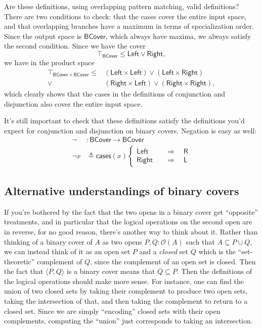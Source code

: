 \documentclass[conference]{IEEEtran}
\newcommand{\Open}[1]{\mathcal{O}({#1})}
\newcommand{\Branch}{\Rightarrow}
\begin{document}
Are these definitions, using overlapping pattern matching, valid definitions? There are two conditions to check: that the cases cover the entire input space, and that overlapping branches have a maximum in terms of specialization order. Since the output space is $\mathsf{BCover}$, which always have maxima, we always satisfy the second condition. Since we have the cover
\[
\top_\mathsf{BCover} \le \mathsf{Left} \vee \mathsf{Right},
\]
we have in the product space
\begin{align*}
\top_{\mathsf{BCover} \times \mathsf{BCover}} \le 
  &(\mathsf{Left} \times \mathsf{Left}) \vee (\mathsf{Left} \times \mathsf{Right})
\\ \vee &(\mathsf{Right} \times \mathsf{Left}) \vee (\mathsf{Right} \times \mathsf{Right}),
\end{align*}
which clearly shows that the cases in the definitions of conjunction and disjunction also cover the entire input space.

It's still important to check that these definitions satisfy the definitions you'd expect for conjunction and disjunction on binary covers. Negation is easy as well:
\begin{align*}
 \neg &: \mathsf{BCover} \to \mathsf{BCover}
\\ \neg x &\triangleq \mathsf{cases}(x)
\begin{cases}
\mathsf{Left}
 \quad &\Branch \quad
 \mathsf{R}
\\
\mathsf{Right}
 \quad &\Branch \quad
 \mathsf{L}
\end{cases}
\end{align*}

\subsection{Alternative understandings of binary covers}

If you're bothered by the fact that the two opens in a binary cover get ``opposite'' treatments, and in particular that the logical operations on the second open are in reverse, for no good reason, there's another way to think about it. Rather than thinking of a binary cover of $A$ as two opens $P, Q : \Open{A}$ such that $A \subseteq P \cup Q$, we can instead think of it as an open set $P$ and a \emph{closed} set $\overline{Q}$ which is the ``set-theoretic'' complement of $Q$, since the complement of an open set is closed. Then the fact that $\langle P, Q \rangle$ is a binary cover means that $\overline{Q} \subseteq P$. Then the definitions of the logical operations should make more sense. For instance, one can find the union of two closed sets by taking their complement to produce two open sets, taking the intersection of that, and then taking the complement to return to a closed set. Since we are simply ``encoding'' closed sets with their open complements, computing the ``union'' just corresponds to taking an intersection.
\end{document}
